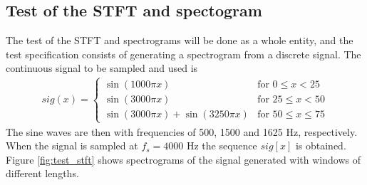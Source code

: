 \subsection{Test of the STFT and spectogram}
The test of the STFT and spectrograms will be done as a whole entity, and the test specification consists of generating a spectrogram from a discrete signal. The continuous signal to be sampled and used is
\begin{align}\label{eq:SPECTROsignal}
sig(x)=\begin{cases}\sin(1000\pi x)&\text{for }0\leq x<25\\
\sin(3000\pi x)&\text{for }25\leq x < 50\\
\sin(3000\pi x)+\sin(3250\pi x)&\text{for }50\leq x\leq75
\end{cases}
\end{align}
The sine waves are then with frequencies of 500, 1500 and 1625 Hz, respectively. When the signal is sampled at $f_s=4000$ Hz the sequence $sig[x]$ is obtained. Figure \ref{fig:test_stft} shows spectrograms of the signal generated with windows of different lengths.
